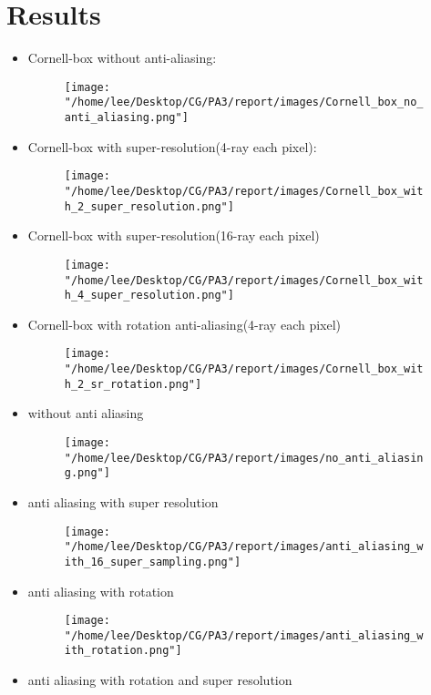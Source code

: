 \documentclass[acmtog]{acmart}
\begin{document}
\section{Results}
\begin{itemize}
	\item Cornell-box without anti-aliasing:
	\begin{figure}[H]
		\centering
		\texttt{[image: "/home/lee/Desktop/CG/PA3/report/images/Cornell\_box\_no\_anti\_aliasing.png"]}
	\end{figure}
	\item Cornell-box with super-resolution(4-ray each pixel):
	\begin{figure}[H]
		\centering
		\texttt{[image: "/home/lee/Desktop/CG/PA3/report/images/Cornell\_box\_with\_2\_super\_resolution.png"]}
	\end{figure}
	\item Cornell-box with super-resolution(16-ray each pixel)
	\begin{figure}[H]
		\centering
		\texttt{[image: "/home/lee/Desktop/CG/PA3/report/images/Cornell\_box\_with\_4\_super\_resolution.png"]}
	\end{figure}
	\item Cornell-box with rotation anti-aliasing(4-ray each pixel)
	\begin{figure}[H]
		\centering
		\texttt{[image: "/home/lee/Desktop/CG/PA3/report/images/Cornell\_box\_with\_2\_sr\_rotation.png"]}
	\end{figure}
	\item without anti aliasing
	\begin{figure}[H]
		\centering
		\texttt{[image: "/home/lee/Desktop/CG/PA3/report/images/no\_anti\_aliasing.png"]}
	\end{figure}
	\item anti aliasing with super resolution
	\begin{figure}[H]
		\centering
		\texttt{[image: "/home/lee/Desktop/CG/PA3/report/images/anti\_aliasing\_with\_16\_super\_sampling.png"]}
	\end{figure}
	\item anti aliasing with rotation
	\begin{figure}[H]
		\centering
		\texttt{[image: "/home/lee/Desktop/CG/PA3/report/images/anti\_aliasing\_with\_rotation.png"]}
	\end{figure}
	\item anti aliasing with rotation and super resolution

\end{itemize}
\end{document}
